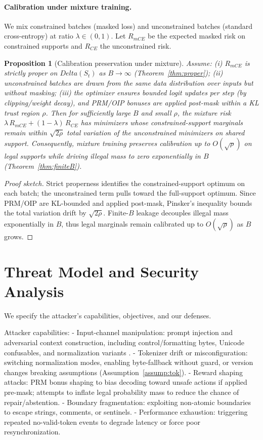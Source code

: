 \documentclass{article}
\def\Delta{Delta}%
\def\mathcal#1{#1}%
\def\mathrm#1{#1}%
\newtheorem{proposition}{Proposition}
\begin{document}
\paragraph{Calibration under mixture training.}
We mix constrained batches (masked loss) and unconstrained batches (standard cross-entropy) at ratio $\lambda\in(0,1)$. Let $\mathcal{R}_{\mathrm{mCE}}$ be the expected masked risk on constrained supports and $\mathcal{R}_{\mathrm{CE}}$ the unconstrained risk. 

\begin{proposition}[Calibration preservation under mixture]\label{prop:mix}
Assume: (i) $\mathcal{R}_{\mathrm{mCE}}$ is strictly proper on $\Delta(\mathcal{S}_t)$ as $B\to\infty$ (Theorem~\ref{thm:proper}); (ii) unconstrained batches are drawn from the same data distribution over inputs but without masking; (iii) the optimizer ensures bounded logit updates per step (by clipping/weight decay), and PRM/OIP bonuses are applied post-mask within a KL trust region $\rho$. Then for sufficiently large $B$ and small $\rho$, the mixture risk $\lambda\,\mathcal{R}_{\mathrm{mCE}} + (1{-}\lambda)\,\mathcal{R}_{\mathrm{CE}}$ has minimizers whose constrained-support marginals remain within $\sqrt{2\rho}$ total variation of the unconstrained minimizers on shared support. Consequently, mixture training preserves calibration up to $O(\sqrt{\rho})$ on legal supports while driving illegal mass to zero exponentially in $B$ (Theorem~\ref{thm:finiteB}).
\end{proposition}

\begin{proof}[Proof sketch]
Strict properness identifies the constrained-support optimum on each batch; the unconstrained term pulls toward the full-support optimum. Since PRM/OIP are KL-bounded and applied post-mask, Pinsker’s inequality bounds the total variation drift by $\sqrt{2\rho}$. Finite-$B$ leakage decouples illegal mass exponentially in $B$, thus legal marginals remain calibrated up to $O(\sqrt{\rho})$ as $B$ grows.
\end{proof}

\section{Threat Model and Security Analysis}\label{sec:threat}
We specify the attacker’s capabilities, objectives, and our defenses.

Attacker capabilities:
- Input-channel manipulation: prompt injection and adversarial context construction, including control/formatting bytes, Unicode confusables, and normalization variants \cite{UTR36,UTS39,UAX15,UAX31}.
- Tokenizer drift or misconfiguration: switching normalization modes, enabling byte-fallback without guard, or version changes breaking assumptions (Assumption~\ref{assump:tok}).
- Reward shaping attacks: PRM bonus shaping to bias decoding toward unsafe actions if applied pre-mask; attempts to inflate legal probability mass to reduce the chance of repair/abstention.
- Boundary fragmentation: exploiting non-atomic boundaries to escape strings, comments, or sentinels.
- Performance exhaustion: triggering repeated no-valid-token events to degrade latency or force poor resynchronization.
\end{document}
